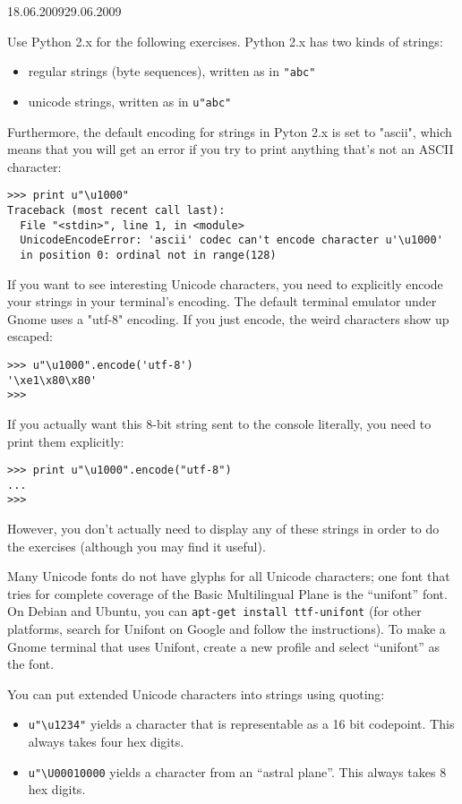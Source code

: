 
\usepackage{amsmath}

\begin{Aufgabenblatt}{3}{18.06.2009}{29.06.2009}


Use Python 2.x for the following exercises.  Python 2.x has two
kinds of strings:
\begin{itemize}
\item regular strings (byte sequences), written as in {\tt "abc"}
\item unicode strings, written as in {\tt u"abc"}
\end{itemize}

Furthermore, the default encoding for strings in Pyton 2.x is set to
"ascii", which means that you will get an error if you try to print
anything that's not an ASCII character:
\begin{verbatim}
>>> print u"\u1000"
Traceback (most recent call last):
  File "<stdin>", line 1, in <module>
  UnicodeEncodeError: 'ascii' codec can't encode character u'\u1000' 
  in position 0: ordinal not in range(128)
\end{verbatim}
If you want to see interesting Unicode characters, you need to explicitly encode
your strings in your terminal's encoding.  The default terminal emulator
under Gnome uses a "utf-8" encoding.
If you just encode, the weird characters show up escaped:
\begin{verbatim}
>>> u"\u1000".encode('utf-8')
'\xe1\x80\x80'
>>> 
\end{verbatim}
If you actually want this 8-bit string sent to the console literally,
you need to print them explicitly:
\begin{verbatim}
>>> print u"\u1000".encode("utf-8")
...
>>> 
\end{verbatim}
However, you don't actually need to display any of these strings in order
to do the exercises (although you may find it useful).

Many Unicode fonts do not have glyphs for all Unicode characters; one
font that tries for complete coverage of the Basic Multilingual Plane
is the ``unifont'' font.  On Debian and Ubuntu, you can 
{\tt apt-get install ttf-unifont} (for other platforms, search for
Unifont on Google and follow the instructions).  To make a Gnome terminal
that uses Unifont, create a new profile and select ``unifont'' as the font.

You can put extended Unicode characters into strings using quoting:
\begin{itemize}
\item \verb|u"\u1234"| yields a character that is representable as a 16 bit
    codepoint.  This always takes four hex digits.
\item \verb|u"\U00010000| yields a character from an ``astral plane''.  This
    always takes 8 hex digits.
\end{itemize}


\end{Aufgabenblatt}
